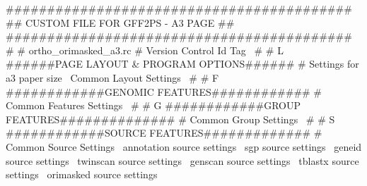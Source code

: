 \documentclass[11pt]{article}
\def\nwendcode{\endtrivlist \endgroup} %
\let\nwdocspar=\par                    %
\begin{document}
\nwenddocs{}\endmoddef
##########################################
##   CUSTOM FILE FOR GFF2PS - A3 PAGE   ##
##########################################
#
# ortho_orimasked_a3.rc
#
\LA{}Version Control Id Tag~{\nwtagstyle{}}\RA{}
#
# L ######PAGE LAYOUT & PROGRAM OPTIONS######
#
\LA{}Settings for a3 paper size~{\nwtagstyle{}}\RA{}
\LA{}Common Layout Settings~{\nwtagstyle{}}\RA{}
#
# F ############GENOMIC FEATURES############
#
\LA{}Common Features Settings~{\nwtagstyle{}}\RA{}
#
# G ############GROUP FEATURES##############
#
\LA{}Common Group Settings~{\nwtagstyle{}}\RA{}
#
# S ############SOURCE FEATURES#############
#
\LA{}Common Source Settings~{\nwtagstyle{}}\RA{}
\LA{}annotation source settings~{\nwtagstyle{}}\RA{}
\LA{}sgp source settings~{\nwtagstyle{}}\RA{}
\LA{}geneid source settings~{\nwtagstyle{}}\RA{}
\LA{}twinscan source settings~{\nwtagstyle{}}\RA{}
\LA{}genscan source settings~{\nwtagstyle{}}\RA{}
\LA{}tblastx source settings~{\nwtagstyle{}}\RA{}
\LA{}orimasked source settings~{\nwtagstyle{}}\RA{}
\nwendcode{}\nwdocspar
\end{document}
